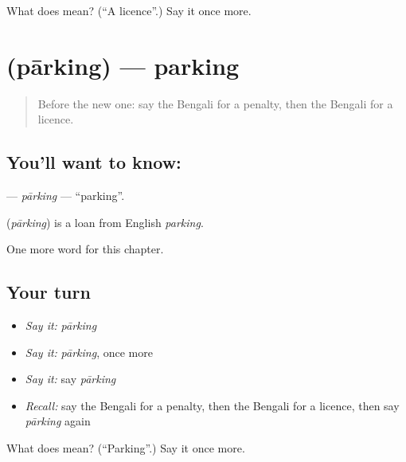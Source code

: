 \begin{tcolorbox}[breakable,colback=teal!4,colframe=teal!35!black,title={Before you move on}]
What does  mean? (\textquotedblleft{}A licence\textquotedblright{}.) Say it once more.
\end{tcolorbox}
\section[\texorpdfstring{\bn{পার্কিং} (pārking)}{পার্কিং (pārking)}]{ (pārking) — parking}

\label{lesson:BN-C226-parking}



\begin{quote}
Before the new one: say the Bengali for a penalty, then the Bengali for a licence.
\end{quote}

\subsection*{You'll want to know: }
\textbf{} — \emph{pārking} — \textquotedblleft{}parking\textquotedblright{}.

\begin{cousinweb}
\textbf{} (\emph{pārking}) is a loan from English \emph{parking}.
\end{cousinweb}

\begin{grammarlens}[title={What you've built}]
One more word for this chapter.
\end{grammarlens}

\subsection*{Your turn}
\begin{itemize}
\raggedright
  \item \emph{Say it:} \emph{pārking}
  \item \emph{Say it:} \emph{pārking}, once more
  \item \emph{Say it:} say \emph{pārking}
  \item \emph{Recall:} say the Bengali for a penalty, then the Bengali for a licence, then say \emph{pārking} again
\end{itemize}

\begin{tcolorbox}[breakable,colback=teal!4,colframe=teal!35!black,title={Before you move on}]
What does  mean? (\textquotedblleft{}Parking\textquotedblright{}.) Say it once more.
\end{tcolorbox}
